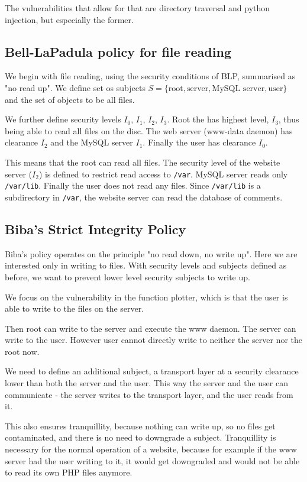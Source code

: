 \documentclass[11pt,journal]{article}
\begin{document}
	The vulnerabilities that allow for that are directory traversal and python injection, but especially the former.
	
	\subsection{Bell-LaPadula policy for file reading}
	We begin with file reading, using the security conditions of BLP, summarised as "no read up". We define set os subjects $S = \{\text{root}, \text{server}, \text{MySQL server}, \text{user}\}$ and the set of objects to be all files.
	
	We further define security levels $I_0$, $I_1$, $I_2$, $I_3$. Root the has highest level, $I_3$, thus being able to read all files on the disc. The web server (www-data daemon) has clearance $I_2$ and the MySQL server $I_1$. Finally the user has clearance $I_0$. 
	
	This means that the root can read all files. The security level of the website server ($I_2$) is defined to restrict read access to \texttt{/var}. MySQL server reads only \texttt{/var/lib}. Finally the user does not read any files. Since \texttt{/var/lib} is a subdirectory in \texttt{/var}, the website server can read the database of comments.
	
	\subsection{Biba's Strict Integrity Policy}
	
	Biba's policy operates on the principle "no read down, no write up". Here we are interested only in writing to files. With security levels and subjects defined as before, we want to prevent lower level security subjects to write up.
	
	We focus on the vulnerability in the function plotter, which is that the user is able to write to the files on the server.
	
	Then root can write to the server and execute the www daemon. The server can write to the user. However user cannot directly write to neither the server nor the root now.
	
	We need to define an additional subject, a transport layer at a security clearance lower than both the server and the user. This way the server and the user can communicate - the server writes to the transport layer, and the user reads from it.
	
	This also ensures tranquillity, because nothing can write up, so no files get contaminated, and there is no need to downgrade a subject. Tranquillity is necessary for the normal operation of a website, because for example if the www server had the user writing to it, it would get downgraded and would not be able to read its own PHP files anymore.
	
\end{document}
